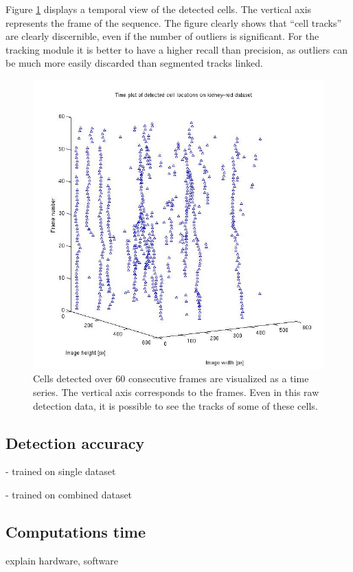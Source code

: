 		Figure \ref{fig:cell_tracks_detection} displays a temporal view of the detected cells. The vertical axis represents the frame of the sequence. The figure clearly shows that ``cell tracks'' are clearly discernible, even if the number of outliers is significant. For the tracking module it is better to have a higher recall than precision, as outliers can be much more easily discarded than segmented tracks linked.
		\begin{figure}
			  \includegraphics[width=\textwidth]{images/cell_tracks}
			\caption{Cells detected over 60 consecutive frames are visualized as a time series. The vertical axis corresponds to the frames. Even in this raw detection data, it is possible to see the tracks of some of these cells.}
		    \label{fig:cell_tracks_detection}
		\end{figure}
		

		
		\subsection{Detection accuracy \statusnew}
			
			- trained on single dataset
			
			- trained on combined dataset
			
		\subsection{Computations time \statusnew}
			explain hardware, software 
